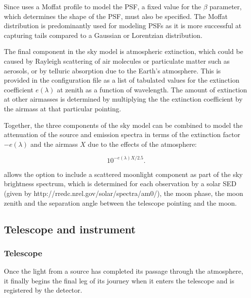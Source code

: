 Since  uses a Moffat profile to model the PSF, a fixed value for the $\beta$ parameter, which determines the shape of the PSF, must also be specified. The Moffat distribution is predominantly used for modeling PSFs as it is more successful at capturing tails compared to a Gaussian or Lorentzian distribution.

The final component in the sky model is atmospheric extinction, which could be caused by Rayleigh scattering of air molecules or particulate matter such as aerosols, or by telluric absorption due to the Earth's atmosphere. This is provided in the configuration file as a list of tabulated values for the extinction coefficient $e(\lambda)$ at zenith as a function of wavelength. The amount of extinction at other airmasses is determined by multiplying the the extinction coefficient by the airmass at that particular pointing.

Together, the three components of the sky model can be combined to model the attenuation of the source and emission spectra in terms of the extinction factor $-e(\lambda)$ and the airmass $X$ due to the effects of the atmosphere: 

\begin{equation}
    10^{-e(\lambda)X/2.5}.
\end{equation}

 allows the option to include a scattered moonlight component as part of the sky brightness spectrum, which is determined for each observation by a solar SED (given by http://rredc.nrel.gov/solar/spectra/am0/), the moon phase, the moon zenith and the separation angle between the telescope pointing and the moon.

\subsection{Telescope and instrument}

\subsubsection{Telescope}
Once the light from a source has completed its passage through the atmosphere, it finally begins the final leg of its journey when it enters the telescope and is registered by the detector.

